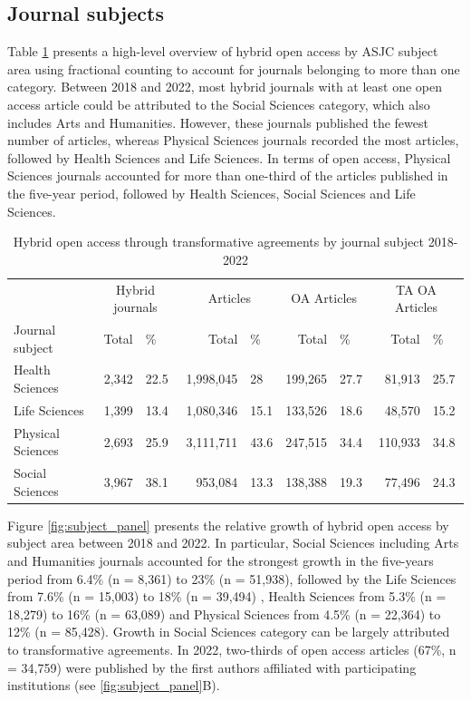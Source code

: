 \documentclass[a4paper,man,floatsintext,longtable,noextraspace,12pt]{apa6}
\begin{document}
\subsection{Journal subjects}\label{journal-subjects}

Table \ref{tab:subject_summary_table} presents a high-level overview of
hybrid open access by ASJC subject area using fractional counting to
account for journals belonging to more than one category. Between 2018
and 2022, most hybrid journals with at least one open access article
could be attributed to the Social Sciences category, which also includes
Arts and Humanities. However, these journals published the fewest number
of articles, whereas Physical Sciences journals recorded the most
articles, followed by Health Sciences and Life Sciences. In terms of
open access, Physical Sciences journals accounted for more than
one-third of the articles published in the five-year period, followed by
Health Sciences, Social Sciences and Life Sciences.

\begin{table}[H]

\caption{\label{tab:subject_summary_table}Hybrid open access through transformative agreements by journal subject 2018-2022}
\centering
\begin{tabular}[t]{lrlrlrlrl}
\toprule
\multicolumn{1}{c}{ } & \multicolumn{2}{c}{Hybrid journals} & \multicolumn{2}{c}{Articles} & \multicolumn{2}{c}{OA Articles} & \multicolumn{2}{c}{TA OA Articles} \\
\cmidrule(l{3pt}r{3pt}){2-3} \cmidrule(l{3pt}r{3pt}){4-5} \cmidrule(l{3pt}r{3pt}){6-7} \cmidrule(l{3pt}r{3pt}){8-9}
Journal subject & Total & \% & Total & \% & Total & \% & Total & \%\\
\midrule
Health Sciences & 2,342 & 22.5 & 1,998,045 & 28 & 199,265 & 27.7 & 81,913 & 25.7\\
Life Sciences & 1,399 & 13.4 & 1,080,346 & 15.1 & 133,526 & 18.6 & 48,570 & 15.2\\
Physical Sciences & 2,693 & 25.9 & 3,111,711 & 43.6 & 247,515 & 34.4 & 110,933 & 34.8\\
Social Sciences & 3,967 & 38.1 & 953,084 & 13.3 & 138,388 & 19.3 & 77,496 & 24.3\\
\bottomrule
\end{tabular}
\end{table}

Figure \ref{fig:subject_panel} presents the relative growth of hybrid
open access by subject area between 2018 and 2022. In particular, Social
Sciences including Arts and Humanities journals accounted for the
strongest growth in the five-years period from 6.4\% (n = 8,361) to 23\%
(n = 51,938), followed by the Life Sciences from 7.6\% (n = 15,003) to
18\% (n = 39,494) , Health Sciences from 5.3\% (n = 18,279) to 16\% (n =
63,089) and Physical Sciences from 4.5\% (n = 22,364) to 12\% (n =
85,428). Growth in Social Sciences category can be largely attributed to
transformative agreements. In 2022, two-thirds of open access articles
(67\%, n = 34,759) were published by the first authors affiliated with
participating institutions (see \ref{fig:subject_panel}B).
\end{document}
